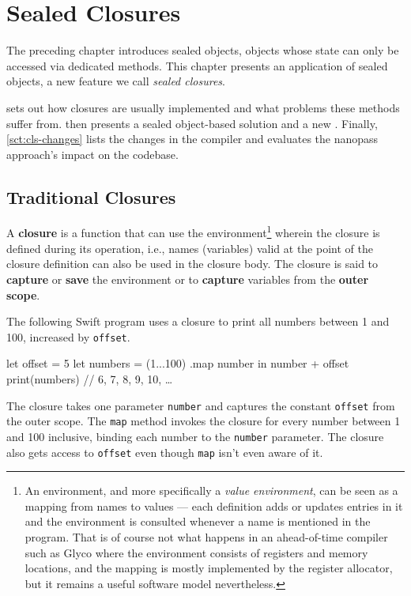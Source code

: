 \documentclass[main.tex]{subfiles}
\begin{document}
\onlyinsubfile{\mainmatter{}}

\chapter{Sealed Closures} \label{ch:cls}
The preceding chapter introduces sealed objects, objects whose state can only be accessed via dedicated methods. This chapter presents an application of sealed objects, a new feature we call \emph{sealed closures}.

 sets out how closures are usually implemented and what problems these methods suffer from.  then presents a sealed object-based solution and a new . Finally, \cref{sct:cls-changes} lists the changes in the compiler and evaluates the nanopass approach's impact on the codebase.

\section{Traditional Closures} \label{sct:cls-trad}
A \textbf{closure} is a function that can use the environment\footnote{An environment, and more specifically a \emph{value environment}, can be seen as a mapping from names to values — each definition adds or updates entries in it and the environment is consulted whenever a name is mentioned in the program. That is of course not what happens in an ahead-of-time compiler such as Glyco where the environment consists of registers and memory locations, and the mapping is mostly implemented by the register allocator, but it remains a useful software model nevertheless.} wherein the closure is defined during its operation, i.e., names (variables) valid at the point of the closure definition can also be used in the closure body. The closure is said to \textbf{capture} or \textbf{save} the environment or to \textbf{capture} variables from the \textbf{outer scope}.

The following Swift program uses a closure to print all numbers between 1 and 100, increased by \texttt{offset}.
\begin{swift}
	let offset = 5
	let numbers = (1...100)
		.map { number in number + offset }
	print(numbers)		// 6, 7, 8, 9, 10, …
\end{swift}
The closure takes one parameter \texttt{number} and captures the constant \texttt{offset} from the outer scope. The \texttt{map} method invokes the closure for every number between 1 and 100 inclusive, binding each number to the \texttt{number} parameter. The closure also gets access to \texttt{offset} even though \texttt{map} isn't even aware of it.
\end{document}

